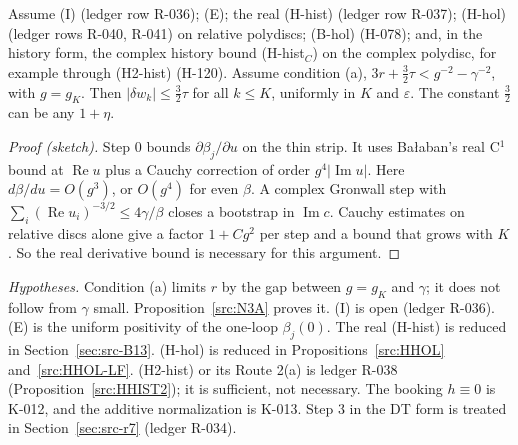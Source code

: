 \begin{proposition}\label{src:HBETA-N3}
Assume (I) (ledger row R-036); (E); the real (H-hist) (ledger row R-037); (H-hol) (ledger rows R-040, R-041) on relative polydiscs; (B-hol) (H-078); and, in the history form, the complex history bound (H-hist$_C$) on the complex polydisc, for example through (H2-hist) (H-120). Assume condition (a), $3r+\tfrac32\tau<g^{-2}-\gamma^{-2}$, with $g=g_K$. Then $|\delta w_k|\le\tfrac32\tau$ for all $k\le K$, uniformly in $K$ and $\varepsilon$. The constant $\tfrac32$ can be any $1+\eta$.
\end{proposition}
\begin{proof}[Proof (sketch)]
Step 0 bounds $\partial\beta_j/\partial u$ on the thin strip. It uses Ba{\l}aban's real C$^1$ bound at $\operatorname{Re}u$ plus a Cauchy correction of order $g^4|\operatorname{Im}u|$. Here $d\beta/du=O(g^3)$, or $O(g^4)$ for even $\beta$. A complex Gronwall step with $\sum_i(\operatorname{Re}u_i)^{-3/2}\le4\gamma/\beta$ closes a bootstrap in $\operatorname{Im}c$. Cauchy estimates on relative discs alone give a factor $1+Cg^2$ per step and a bound that grows with $K$. So the real derivative bound is necessary for this argument.
\end{proof}
\emph{Hypotheses.} Condition (a) limits $r$ by the gap between $g=g_K$ and $\gamma$; it does not follow from $\gamma$ small. Proposition~\ref{src:N3A} proves it. (I) is open (ledger R-036). (E) is the uniform positivity of the one-loop $\beta_j(0)$. The real (H-hist) is reduced in Section~\ref{sec:src-B13}. (H-hol) is reduced in Propositions~\ref{src:HHOL} and~\ref{src:HHOL-LF}. (H2-hist) or its Route 2(a) is ledger R-038 (Proposition~\ref{src:HHIST2}); it is sufficient, not necessary. The booking $h\equiv0$ is K-012, and the additive normalization is K-013. Step 3 in the DT form is treated in Section~\ref{sec:src-r7} (ledger R-034).

